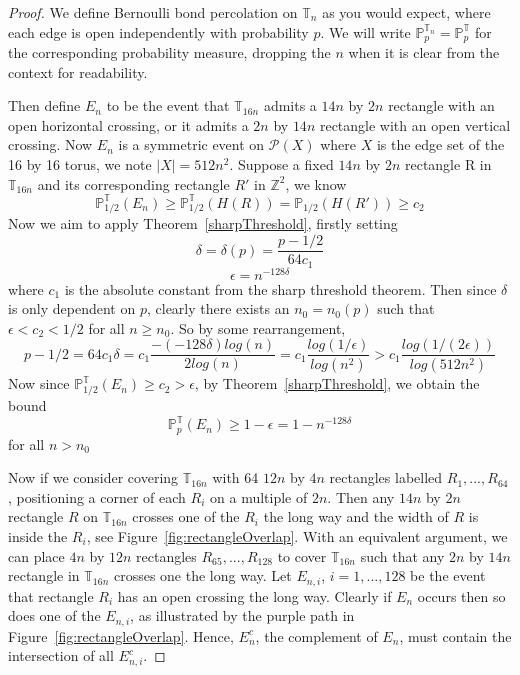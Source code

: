 \documentclass[a4paper,11pt]{article}
\theoremstyle{definition}
\newcommand{\ints}{\mathbb{Z}}
\newcommand{\prbhlf}{\mathbb{P}_{1/2}}
\newcommand{\probtorus}{\mathbb{P}^{\mathbb{T}}_{p}}
\newcommand{\probtorush}{\mathbb{P}^{\mathbb{T}}_{1/2}}
\begin{document}
\begin{proof}
	We define Bernoulli bond percolation on $\mathbb{T}_n$ as you would expect, where each edge is open independently with probability $p$. We will write $\mathbb{P}^{\mathbb{T}_n}_{p} = \probtorus$ for the corresponding probability measure, dropping the $n$ when it is clear from the context for readability.
	
	Then define $E_n$ to be the event that $\mathbb{T}_{16n}$ admits a $14n$ by $2n$ rectangle with an open horizontal crossing, or it admits a $2n$ by $14n$ rectangle with an open vertical crossing. Now $E_n$ is a symmetric event on $\mathcal{P}(X)$ where $X$ is the edge set of the 16 by 16 torus, we note $|X| = 512n^2$. Suppose a fixed $14n$ by $2n$ rectangle R in $\mathbb{T}_{16n}$ and its corresponding rectangle $R'$ in $\ints^2$, we know 
	$$\probtorush(E_n) \geq \probtorush(H(R)) = \prbhlf(H(R')) \geq c_2$$
	Now we aim to apply Theorem~\ref{sharpThreshold}, firstly setting $$\delta = \delta(p) = \frac{p-1/2}{64 c_1}$$
	$$\epsilon = n^{-128 \delta}$$
	where $c_1$ is the absolute constant from the sharp threshold theorem. Then since $\delta$ is only dependent on $p$, clearly there exists an $n_0 = n_0(p)$ such that $\epsilon < c_2< 1/2$ for all $n \geq n_0$. 
	So by some rearrangement, 
	$$p-1/2 = 64 c_1 \delta = c_1\frac{-(-128 \delta)log(n)}{2log(n)} = c_1\frac{log(1/\epsilon)}{log(n^2)} > c_1\frac{log(1/(2\epsilon))}{log(512n^2)}$$  
	Now since $\probtorush(E_n) \geq c_2 > \epsilon$, by Theorem~\ref*{sharpThreshold}, we obtain the bound
	$$\probtorus(E_n) \geq 1-\epsilon = 1-n^{-128 \delta}$$
	for all $n>n_0$

	Now if we consider covering $\mathbb{T}_{16n}$ with 64 $12n$ by $4n$ rectangles labelled $R_1,...,R_{64}$, positioning a corner of each $R_i$ on a multiple of $2n$. Then any $14n$ by $2n$ rectangle $R$ on $\mathbb{T}_{16n}$ crosses one of the $R_i$ the long way and the width of $R$ is inside the $R_i$, see Figure~\ref*{fig:rectangleOverlap}. With an equivalent argument, we can place $4n$ by $12n$ rectangles $R_{65},...,R_{128}$ to cover $\mathbb{T}_{16n}$ such that any $2n$ by $14n$ rectangle in $\mathbb{T}_{16n}$ crosses one the long way. Let $E_{n,i}$, $i = 1,...,128$ be the event that rectangle $R_i$ has an open crossing the long way. Clearly if $E_n$ occurs then so does one of the $E_{n,i}$, as illustrated by the purple path in Figure~\ref*{fig:rectangleOverlap}. Hence, $E^c_n$, the complement of $E_n$, must contain the intersection of all $E^c_{n,i}$.


\end{proof}
\end{document}
